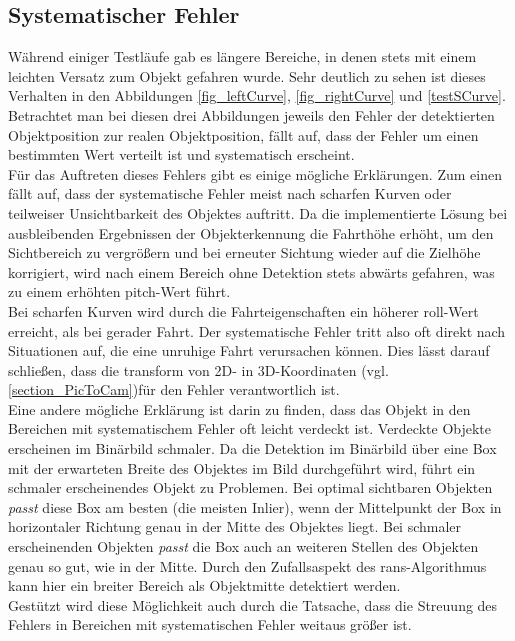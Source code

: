 \subsection{Systematischer Fehler}
\label{sec_sysError}
Während einiger Testläufe gab es längere Bereiche, in denen stets mit einem leichten Versatz zum Objekt gefahren wurde. Sehr deutlich zu sehen ist dieses Verhalten in den Abbildungen \ref{fig_leftCurve}, \ref{fig_rightCurve} und \ref{testSCurve}. Betrachtet man bei diesen drei Abbildungen jeweils den Fehler der detektierten Objektposition zur realen Objektposition, fällt auf, dass der Fehler um einen bestimmten Wert verteilt ist und systematisch erscheint.\\
Für das Auftreten dieses Fehlers gibt es einige mögliche Erklärungen.
Zum einen fällt auf, dass der systematische Fehler meist nach scharfen Kurven oder teilweiser Unsichtbarkeit des Objektes auftritt. Da die implementierte Lösung bei ausbleibenden Ergebnissen der Objekterkennung die Fahrthöhe erhöht, um den Sichtbereich zu vergrößern und bei erneuter Sichtung wieder auf die Zielhöhe korrigiert, wird nach einem Bereich ohne Detektion stets abwärts gefahren, was zu einem erhöhten \gls{pitch}-Wert führt.\\
Bei scharfen Kurven wird durch die Fahrteigenschaften ein höherer \gls{roll}-Wert erreicht, als bei gerader Fahrt.
Der systematische Fehler tritt also oft direkt nach Situationen auf, die eine unruhige Fahrt verursachen können. Dies lässt darauf schließen, dass die \gls{transform} von 2D- in 3D-Koordinaten (vgl. \ref{section_PicToCam})für den Fehler verantwortlich ist.\\
Eine andere mögliche Erklärung ist darin zu finden, dass das Objekt in den Bereichen mit systematischem Fehler oft leicht verdeckt ist. Verdeckte Objekte erscheinen im Binärbild schmaler. Da die Detektion im Binärbild über eine Box mit der erwarteten Breite des Objektes im Bild durchgeführt wird, führt ein schmaler erscheinendes Objekt zu Problemen. Bei optimal sichtbaren Objekten \textit{passt} diese Box am besten (die meisten Inlier), wenn der Mittelpunkt der Box in horizontaler Richtung genau in der Mitte des Objektes liegt. Bei schmaler erscheinenden Objekten \textit{passt} die Box auch an weiteren Stellen des Objekten genau so gut, wie in der Mitte. Durch den Zufallsaspekt des \gls{rans}-Algorithmus kann hier ein breiter Bereich als Objektmitte detektiert werden.\\
Gestützt wird diese Möglichkeit auch durch die Tatsache, dass die Streuung des Fehlers in Bereichen mit systematischen Fehler weitaus größer ist.
